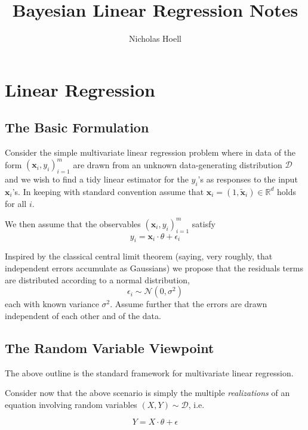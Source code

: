 \documentclass[12pt]{article}
\title{Bayesian Linear Regression Notes}
\author{Nicholas Hoell}
\newcommand{\x}{\mathbf{x}}
\newcommand{\norm}{\mathcal{N}}
\begin{document}
\maketitle
\section{Linear Regression}
\subsection{The Basic Formulation}
Consider the simple multivariate linear regression problem where in data of the form ${(\x_i, y_i)}_{i=1}^m$ are drawn from an unknown data-generating distribution $\mathcal{D}$ and we wish to find a tidy linear estimator for the $y_i$'s as responses to the input $\x_i$'s.  In keeping with standard convention assume that $\x_i = (1, \tilde{\x}_i) \in \mathbb{R}^d$ holds for all $i$. 

We then assume that the observables ${(\x_i, y_i)}_{i=1}^m$ satisfy
\begin{equation} 
\label{lr}
y_i = \x_i \cdot \theta + \epsilon_i
\end{equation}

Inspired by the classical central limit theorem (saying, very roughly, that independent errors accumulate as Gaussians) we propose that the residuals terms are distributed according to a  normal distribution, 
\[\epsilon_i \sim \norm(0, \sigma^2)\]
each with known variance $\sigma^2$. Assume further that the errors are drawn independent of each other and of the data.
\subsection{The Random Variable Viewpoint}

The above outline is the standard framework for multivariate linear regression.


 Consider now that the above scenario is simply the multiple {\it realizations} of an equation involving random variables $(X, Y) \sim \mathcal{D}$, i.e. 
 
\begin{equation}
\label{prob}Y = X \cdot \theta + \epsilon
\end{equation}
\end{document}
